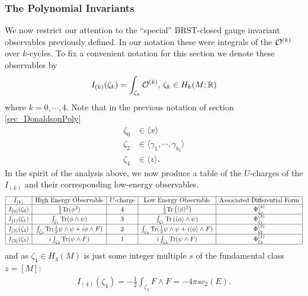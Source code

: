 \documentclass[12pt, onecolumn]{article}
\begin{document}
\subsubsection{The Polynomial Invariants}
We now restrict our attention to the ``special'' BRST-closed gauge invariant observables previously defined.  In our notation these were integrals of the ${\cal O}^{(k)}$ over $k$-cycles.  To fix a convenient notation for this section we denote these observables by
\begin{align*}
I_{(k)}(\zeta_{k})=\int_{\zeta_{k}}{\cal O}^{(k)},\,\zeta_{k} \in H_{k}(M;\mathbb{R})
\end{align*}
where $k=0,\cdots,4$.  Note that in the previous notation of section \ref{sec_DonaldsonPoly}
\begin{align*}
\zeta_{0} &\in \langle x \rangle\\
\zeta_{2} &\in \langle \gamma_{1},\cdots,\gamma_{b_{2}} \rangle\\
\zeta_{4} &\in \langle z \rangle.
\end{align*}
In the spirit of the analysis above, we now produce a table of the $U$-charges of the $I_{(k)}$ and their corresponding low-energy observables.
\begin{align*}
\begin{array}{|c|c|c|c|c|}
\hline
I_{(k)} & \text{High Energy Observable} & \text{$U$-charge} & \text{Low Energy Observable} & \text{Associated Differential Form}\\
\hline
I_{(0)}(\zeta_{0}) & \frac{1}{2}\text{Tr}(\phi^2) & 4 & \frac{1}{2} \text{Tr}\left(\langle \phi \rangle^2\right) & \Phi_{\zeta_{0}}^{(4)}\\
\hline
I_{(1)}(\zeta_{1}) & \int_{\zeta_{1}}\text{Tr}(\phi \wedge \psi) & 3 & \int_{\zeta_{1}}\text{Tr}\left(\langle \phi \rangle \wedge \psi\right) & \Phi_{\zeta_{1}}^{(3)}\\
\hline
I_{(2)}(\zeta_{2}) & \int_{\zeta_{2}}\text{Tr}(\frac{1}{2}\psi \wedge \psi + i \phi \wedge F) & 2 & \int_{\zeta_{2}}\text{Tr}(\frac{1}{2}\psi \wedge \psi + i \langle \phi \rangle \wedge F) & \Phi_{\zeta_{2}}^{(2)}\\
\hline
I_{(3)}(\zeta_{3}) & i\int_{\zeta_{3}}\text{Tr}(\psi \wedge F) & 1 & i\int_{\zeta_{3}}\text{Tr}(\psi \wedge F) & \Phi_{\zeta_{3}}^{(1)}\\
\hline
\end{array}
\end{align*}
and as $\zeta_{4} \in H_{4}(M)$ is just some integer multiple $s$ of the fundamental class $z=[M]$:
\begin{align*}
I_{(4)}(\zeta_{4})=-\frac{1}{2}\int_{\zeta_{4}}F \wedge F = -4\pi s c_{2}(E).
\end{align*}
\end{document}
